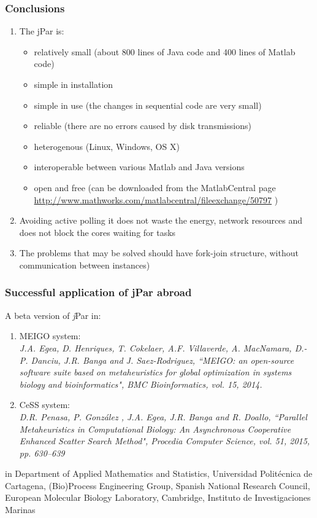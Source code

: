 \documentclass{beamer}
\begin{document}
\begin{frame}
   \frametitle{Conclusions}
   \begin{enumerate}
      \item The jPar is:
            \begin{itemize}
               \item relatively small (about 800 lines of Java code and 400 lines of Matlab code)
               \item simple in installation
               \item simple in use (the changes in sequential code are very small)
               \item reliable (there are no errors caused by disk transmissions)
               \item heterogenous (Linux, Windows, OS X)
               \item interoperable between various Matlab and Java versions
               \item open and free (can be downloaded from the MatlabCentral page
                     \url{http://www.mathworks.com/matlabcentral/fileexchange/50797} )
            \end{itemize}
            \newpage
      \item Avoiding active
            polling it does not waste the energy, network resources and does
            not block the cores waiting for tasks
      \item The problems that may be solved should have fork-join structure, without communication between instances)
   \end{enumerate}
\end{frame}
\begin{frame}
   \frametitle{Successful application of jPar abroad}
   A beta version of {\emph jPar}  in:
   \begin{enumerate}
      \item MEIGO system: \\
            {\em J.A. Egea, D. Henriques, T. Cokelaer, A.F. Villaverde, A. MacNamara, D.-P. Danciu, J.R. Banga and J. Saez-Rodriguez, ``MEIGO: an open-source software suite based on metaheuristics for global optimization in systems biology and bioinformatics", BMC Bioinformatics, vol. 15,  2014.}
      \item CeSS system:\\
            {\em D.R. Penasa, P. Gonz\'{a}lez , J.A. Egea, J.R. Banga and R. Doallo,
            ``Parallel Metaheuristics in Computational Biology: An Asynchronous Cooperative Enhanced Scatter Search Method", Procedia Computer Science, vol. 51, 2015, pp.  630--639}
   \end{enumerate}
   in Department of Applied Mathematics and Statistics, Universidad Politécnica de Cartagena,
   (Bio)Process Engineering Group, Spanish National Research Council,
   European Molecular Biology Laboratory, Cambridge,
   Instituto de Investigaciones Marinas
\end{frame}
\end{document}
